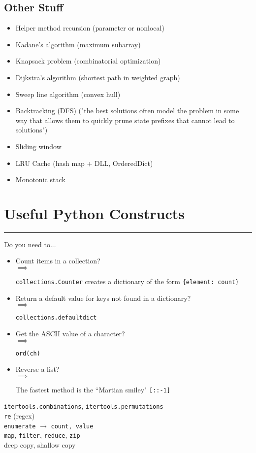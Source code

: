 \documentclass[12pt]{article}
\newcommand{\imply}[1]{
  \-\hspace{1em}$\implies$ \parbox[t]{11.2cm}{#1}
}
\begin{document}
\subsection*{Other Stuff}

\begin{itemize}
  \item Helper method recursion (parameter or nonlocal)
  \item Kadane's algorithm (maximum subarray)
  \item Knapsack problem (combinatorial optimization)
  \item Dijkstra's algorithm (shortest path in weighted graph)
  \item Sweep line algorithm (convex hull)
  \item Backtracking (DFS) ("the best solutions often model the problem in some way that allows them to quickly prune state prefixes that cannot lead to solutions")
  \item Sliding window
  \item LRU Cache (hash map + DLL, OrderedDict)
  \item Monotonic stack
\end{itemize}

\section*{Useful Python Constructs}
\hrule\vspace{5ex}

Do you need to...
\begin{itemize}
  \item Count items in a collection? \smallskip\\
    \imply{\texttt{collections.Counter} creates a dictionary of the form \texttt{\{element: count\}}}
  \item Return a default value for keys not found in a dictionary? \smallskip\\
    \imply{\texttt{collections.defaultdict}}
  \item Get the ASCII value of a character? \smallskip\\
    \imply{\texttt{ord(ch)}}
  \item Reverse a list? \smallskip\\
    \imply{The fastest method is the ``Martian smiley" \texttt{[::-1]}}
\end{itemize}

\texttt{itertools.combinations}, \texttt{itertools.permutations} \\
\texttt{re} (regex) \\
\texttt{enumerate} $\rightarrow$ \texttt{count, value} \\
\texttt{map}, \texttt{filter}, \texttt{reduce}, \texttt{zip} \\
deep copy, shallow copy
\end{document}
